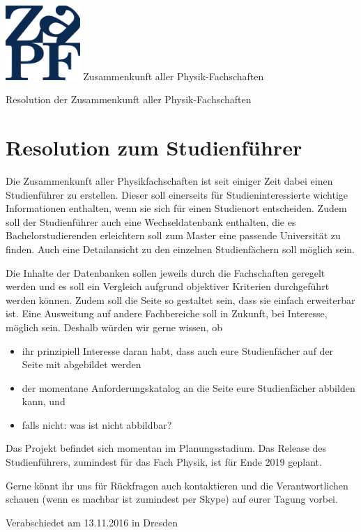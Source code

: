 \documentclass[DIV=calc]{scrartcl}
\begin{document}
\hspace{0.87\textwidth}
\begin{minipage}{120pt}
\vspace{-1.8cm}
\includegraphics[width=80pt]{logo.pdf}
\centering
\small Zusammenkunft aller Physik-Fachschaften
\end{minipage}
\begin{center}
\huge{Resolution der Zusammenkunft aller Physik-Fachschaften} \\
\normalsize
\end{center}

\vspace{1cm}
\section*{Resolution zum Studienführer}
Die Zusammenkunft aller Physikfachschaften ist seit einiger Zeit dabei einen Studienführer zu erstellen. Dieser soll einerseits für Studieninteressierte wichtige Informationen enthalten, wenn sie sich für einen Studienort entscheiden. Zudem soll der Studienführer auch eine Wechseldatenbank enthalten, die es Bachelorstudierenden erleichtern soll zum Master eine passende Universität zu finden. Auch eine Detailansicht zu den einzelnen Studienfächern soll möglich sein.

Die Inhalte der Datenbanken sollen jeweils durch die Fachschaften geregelt werden und es soll ein Vergleich aufgrund objektiver Kriterien durchgeführt werden können. Zudem soll die Seite so gestaltet sein, dass sie einfach erweiterbar ist. Eine Ausweitung auf andere Fachbereiche soll in Zukunft, bei Interesse, möglich sein. Deshalb würden wir gerne wissen, ob

\begin{itemize}
\item ihr prinzipiell Interesse daran habt, dass auch eure Studienfächer auf der Seite mit abgebildet werden
\item der momentane Anforderungskatalog an die Seite eure Studienfächer abbilden kann, und
\item falls nicht: was ist nicht abbildbar?
\end{itemize}

Das Projekt befindet sich momentan im Planungsstadium. Das Release des Studienführers, zumindest für das Fach Physik, ist für Ende 2019 geplant.

Gerne könnt ihr uns für Rückfragen auch kontaktieren und die Verantwortlichen schauen (wenn es machbar ist zumindest per Skype) auf eurer Tagung vorbei.
\vfill
\begin{flushright}
Verabschiedet am 13.11.2016 in Dresden
\end{flushright}
\end{document}
